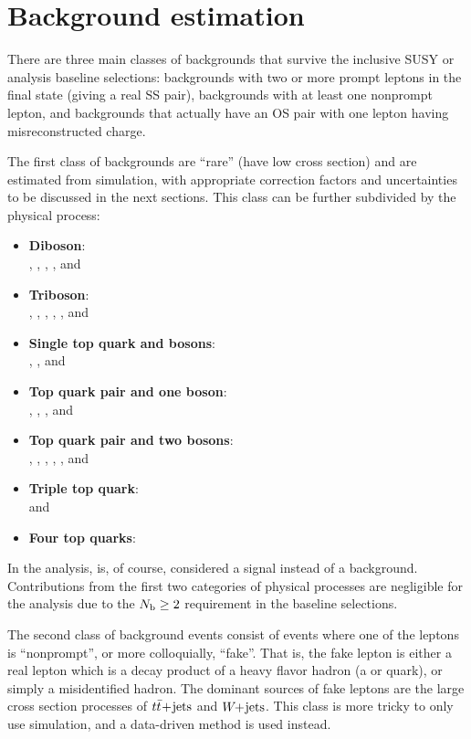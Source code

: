 \chapter{Background estimation}

There are three main classes of backgrounds that survive the inclusive SUSY or
\smft analysis baseline selections: backgrounds with two or more prompt leptons
in the final state (giving a real SS pair), backgrounds with at least one nonprompt lepton,
and backgrounds that actually have an OS pair with one lepton having misreconstructed charge.

The first class of backgrounds are ``rare'' (have low cross section) and are estimated from
simulation, with appropriate correction factors and uncertainties to be discussed in the next
sections. This class can be further subdivided by the physical process:

\begin{itemize}
    \item \textbf{Diboson}: \\ \WZ, \ZZ, \Zgamma, \Wgamma, and \WpWp
    \item \textbf{Triboson}: \\ \WWW, \WWZ, \WZZ, \ZZZ, \WWgamma, and \WZgamma
    \item \textbf{Single top quark and bosons}: \\ \tgamma, \tZgamma, and \tWZ
    \item \textbf{Top quark pair and one boson}: \\ \ttW, \ttZ, \ttH, and \ttgamma
    \item \textbf{Top quark pair and two bosons}: \\ \ttWW, \ttWZ, \ttZZ, \ttWH, \ttZH, and \ttHH
    \item \textbf{Triple top quark}: \\ \ttt and \tttW
    \item \textbf{Four top quarks}: \\ \tttt
\end{itemize}

In the \smft analysis, \tttt is, of course, considered a signal instead of a background.
Contributions from the first two categories of physical processes are negligible for the
\smft analysis due to the $N_\mathrm{b}\geq 2$ requirement in the baseline selections.

The second class of background events consist of events where one of the leptons is
``nonprompt'', or more colloquially, ``fake''. That is, the fake lepton is
either a real lepton which is a decay product of a heavy flavor hadron (a
\PQb or \PQc quark), or simply a misidentified hadron. The dominant sources of fake leptons
are the large cross section processes of $t\bar{t}\!+\!\mathrm{jets}$ and $W\!\!+\!\mathrm{jets}$. This class is more
tricky to only use simulation, and a data-driven method is used instead.

